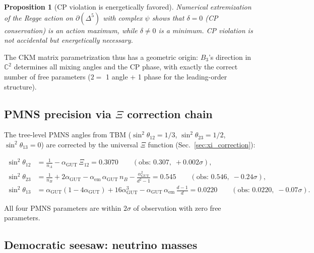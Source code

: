 \documentclass[12pt]{article}
\newtheorem{proposition}[theorem]{Proposition}
\theoremstyle{remark}
\theoremstyle{definition}
\newcommand{\CC}{\mathbb{C}}
\newcommand{\agut}{\alpha_{\mathrm{GUT}}}
\begin{document}
\begin{proposition}[CP violation is energetically favored]
\label{prop:cp}
Numerical extremization of the Regge action on $\partial(\Delta^5)$ with complex $\psi$ shows that $\delta = 0$ (CP conservation) is an action \emph{maximum}, while $\delta \neq 0$ is a \emph{minimum}.  CP violation is not accidental but energetically necessary.
\end{proposition}

The CKM matrix parametrization thus has a geometric origin: $B_3$'s direction in $\CC^2$ determines all mixing angles and the CP phase, with exactly the correct number of free parameters ($2 = $ 1 angle + 1 phase for the leading-order structure).

\subsection{PMNS precision via $\Xi$ correction chain}
\label{sec:pmns_xi}

The tree-level PMNS angles from TBM ($\sin^2\theta_{12} = 1/3$, $\sin^2\theta_{23} = 1/2$, $\sin^2\theta_{13} = 0$) are corrected by the universal $\Xi$ function (Sec.~\ref{sec:xi_correction}):

\begin{align}
\sin^2\theta_{12} &= \frac{1}{n_A} - \agut\,\Xi_{12} = 0.3070 \qquad(\text{obs: } 0.307,\; +0.002\sigma), \\
\sin^2\theta_{23} &= \frac{1}{n_B} + 2\agut - \alpha_\mathrm{em}\,\agut\,n_B - \frac{\agut^2}{d^2-1} = 0.545 \qquad(\text{obs: } 0.546,\; -0.24\sigma), \\
\sin^2\theta_{13} &= \agut(1 - 4\agut) + 16\agut^3 - \agut\,\alpha_\mathrm{em}\,\frac{d-1}{d} = 0.0220 \qquad(\text{obs: } 0.0220,\; -0.07\sigma).
\end{align}

All four PMNS parameters are within $2\sigma$ of observation with zero free parameters.

\subsection{Democratic seesaw: neutrino masses}
\label{sec:democratic_seesaw}
\end{document}
